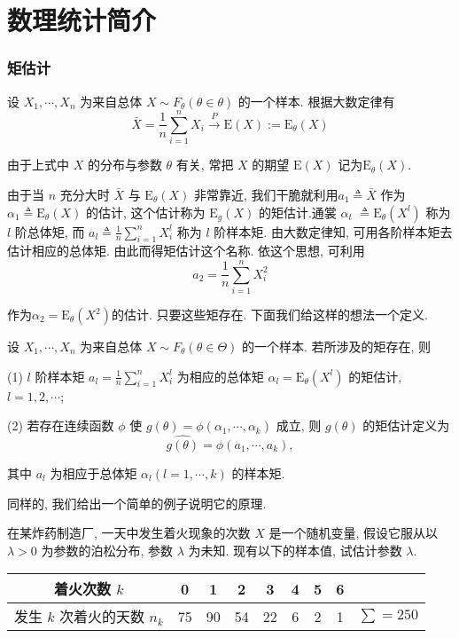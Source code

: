 \part{数理统计简介}



\section{矩估计}

设 $X_1, \cdots, X_n$ 为来自总体 $X \sim F_\theta(\theta \in \theta)$ 的一个样本. 根据大数定律有
$$\bar{X}=\frac{1}{n} \sum_{i=1}^n X_i \stackrel{P}{\longrightarrow} \mathrm{E}(X) := \mathrm{E}_\theta(X)$$

由于上式中 $X$ 的分布与参数 $\theta$ 有关, 常把 $X$ 的期望 $\mathrm{E}(X)$ 记为$\mathrm{E}_\theta(X)$. 

由于当 $n$ 充分大时 $\bar{X}$ 与 $\mathrm{E}_\theta(X)$ 非常靠近, 我们干脆就利用$a_1 \triangleq \bar{X}$ 作为 $\alpha_1 \triangleq \mathrm{E}_\theta(X)$ 的估计, 这个估计称为 $\mathrm{E}_g(X)$ 的矩估计.通裳 $\alpha_t$ $\triangleq \mathrm{E}_\theta\left(X^l\right)$ 称为 $l$ 阶总体矩, 而 $a_l \triangleq \frac{1}{n} \sum_{i=1}^n X_i^l$ 称为 $l$ 阶样本矩. 由大数定律知, 可用各阶样本矩去估计相应的总体矩. 由此而得矩估计这个名称. 依这个思想, 可利用
$$
a_2=\frac{1}{n} \sum_{i=1}^n X_i^2
$$

作为$\alpha_2 =\mathrm E_\theta ({X^2})$的估计. 只要这些矩存在. 下面我们给这样的想法一个定义. 

\begin{definition}
    设 $X_1, \cdots, X_n$ 为来自总体 $X \sim F_\theta(\theta \in \Theta)$ 的一个样本. 若所涉及的矩存在, 则

(1) $l$ 阶样本矩 $a_l=\frac{1}{n} \sum_{i=1}^n X_i^l$ 为相应的总体矩 $\alpha_l=\mathrm{E}_\theta\left(X^l\right)$ 的矩估计, $l=1,2, \cdots$;


(2) 若存在连续函数 $\phi$ 使 $g(\theta)=\phi\left(\alpha_1, \cdots, \alpha_k\right)$ 成立, 则 $g(\theta)$ 的矩估计定义为
$$
\widehat{g(\theta)}=\phi\left(a_1, \cdots, a_k\right),
$$

其中 $a_l$ 为相应于总体矩 $\alpha_l(l=1, \cdots, k)$ 的样本矩.
\end{definition}

同样的, 我们给出一个简单的例子说明它的原理. 
\begin{example}
    在某炸药制造厂, 一天中发生着火现象的次数 $X$ 是一个随机变量, 假设它服从以 $\lambda>0$ 为参数的泊松分布, 参数 $\lambda$ 为未知. 现有以下的样本值, 试估计参数 $\lambda$.

\begin{tabular}{c|ccccccc|c} 
    着火次数 $k$ & 0 & 1 & 2 & 3 & 4 & 5 & 6 & \\
    \hline 发生 $k$ 次着火的天数 $n_k$ & 75 & 90 & 54 & 22 & 6 & 2 & 1 & $\sum=250$
    \end{tabular}
\end{example}

